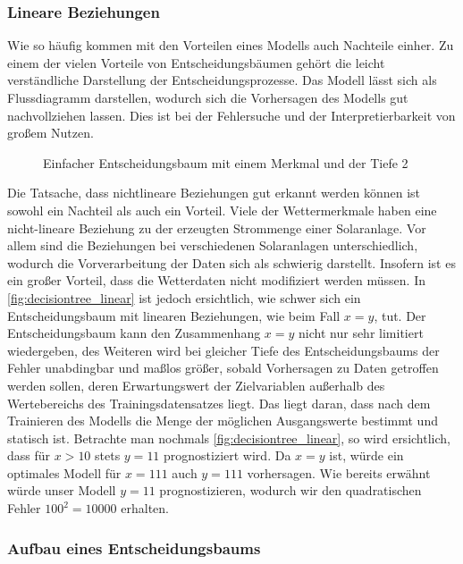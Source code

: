 \documentclass[12pt, a4paper]{article}
\begin{document}

\subsubsection{Lineare Beziehungen}

Wie so häufig kommen mit den Vorteilen eines Modells auch Nachteile einher. Zu einem der vielen Vorteile von Entscheidungsbäumen gehört die leicht verständliche Darstellung der Entscheidungsprozesse. Das Modell lässt sich als Flussdiagramm darstellen, wodurch sich die Vorhersagen des Modells gut nachvollziehen lassen. Dies ist bei der Fehlersuche und der Interpretierbarkeit von großem Nutzen.

\begin{figure}
\centering
\def\svgwidth{350pt}

\caption{Einfacher Entscheidungsbaum mit einem Merkmal und der Tiefe 2}
\label{fig:decisiontree_linear}
\end {figure}

Die Tatsache, dass nichtlineare Beziehungen gut erkannt werden können ist sowohl ein Nachteil als auch ein Vorteil. Viele der Wettermerkmale haben eine nicht-lineare Beziehung zu der erzeugten Strommenge einer Solaranlage. Vor allem sind die Beziehungen bei verschiedenen Solaranlagen unterschiedlich, wodurch die Vorverarbeitung der Daten sich als schwierig darstellt. Insofern ist es ein großer Vorteil, dass die Wetterdaten nicht modifiziert werden müssen. In \autoref{fig:decisiontree_linear} ist jedoch ersichtlich, wie schwer sich ein Entscheidungsbaum mit linearen Beziehungen, wie beim Fall $x=y$, tut. Der Entscheidungsbaum kann den Zusammenhang $x=y$ nicht nur sehr limitiert wiedergeben, des Weiteren wird bei gleicher Tiefe des Entscheidungsbaums der Fehler  unabdingbar und maßlos größer, sobald Vorhersagen zu Daten getroffen werden sollen, deren Erwartungswert der Zielvariablen außerhalb des Wertebereichs des Trainingsdatensatzes liegt. Das liegt daran, dass nach dem Trainieren des Modells die Menge der möglichen Ausgangswerte bestimmt und statisch ist. Betrachte man nochmals \autoref{fig:decisiontree_linear}, so wird ersichtlich, dass für $x>10$ stets $y=11$ prognostiziert wird. Da $x=y$ ist, würde ein optimales Modell für $x=111$ auch $y=111$ vorhersagen. Wie bereits erwähnt würde unser Modell $y=11$ prognostizieren, wodurch wir den quadratischen Fehler $100^{2}=10000$ erhalten. 

\subsubsection{Aufbau eines Entscheidungsbaums}
\label{subsubsec:decisiontree_structure}
\end{document}
